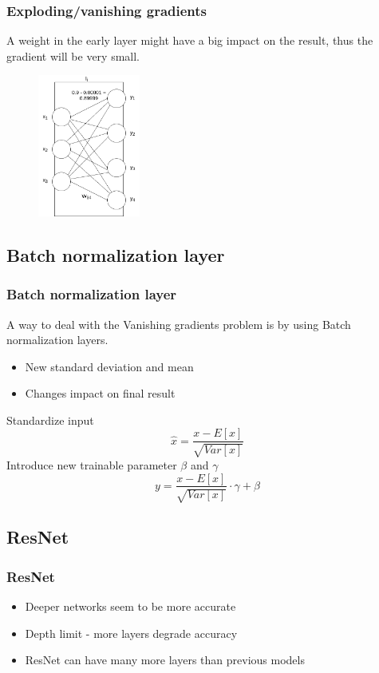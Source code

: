 \documentclass{beamer}
\begin{document}
\begin{frame}
    \frametitle{Exploding/vanishing gradients}
    
    A weight in the early layer might have a big impact on the result, thus the gradient will be very small.
    \begin{figure}
        \centering
        \includegraphics[width=0.3\textwidth]{../assets/linear-layer-vanishing-gradient.drawio.png}
    \end{figure}
\end{frame}

\subsection{Batch normalization layer}

\begin{frame}
    \frametitle{Batch normalization layer}

    A way to deal with the Vanishing gradients problem is by using Batch normalization layers.

    \begin{itemize}
        \item New standard deviation and mean
        \item Changes impact on final result
    \end{itemize}

    \pause
    Standardize input
    $$\hat{x} = \frac{x - E[x]}{\sqrt{Var[x]}}$$
    \pause
    Introduce new trainable parameter $\beta$ and $\gamma$
    $$y = \frac{x - E[x]}{\sqrt{Var[x]}} \cdot \gamma + \beta$$
\end{frame}

\subsection{ResNet}

\begin{frame}
    \frametitle{ResNet}

    \begin{itemize}
        \item Deeper networks seem to be more accurate
        \item Depth limit - more layers degrade accuracy
        \item ResNet can have many more layers than previous models
    \end{itemize}
\end{frame}
\end{document}
